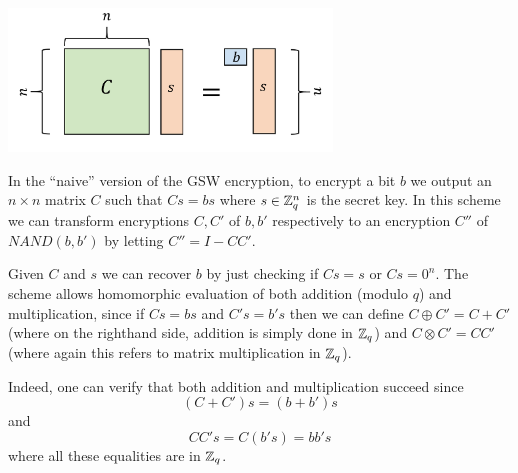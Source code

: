 
\begin{marginfigure}
\centering
\includegraphics[width=\linewidth, height=1.5in, keepaspectratio]{../figure/naivegsw.png}
\caption{In the ``naive'' version of the GSW encryption, to encrypt a
bit \(b\) we output an \(n\times n\) matrix \(C\) such that \(Cs=bs\)
where \(s \in {\mathbb{Z}}_q^n\) is the secret key. In this scheme we can
transform encryptions \(C,C'\) of \(b,b'\) respectively to an encryption
\(C''\) of \(\ensuremath{\mathit{NAND}}(b,b')\) by letting
\(C'' = I-CC'\).}
\label{naivegswfig}
\end{marginfigure}

Given \(C\) and \(s\) we can recover \(b\) by just checking if \(Cs=s\)
or \(Cs=0^n\). The scheme allows homomorphic evaluation of both addition
(modulo \(q\)) and multiplication, since if \(Cs = bs\) and \(C's=b's\)
then we can define \(C \oplus C' = C + C'\) (where on the righthand
side, addition is simply done in \({\mathbb{Z}}_q\)) and
\(C\otimes C' = \ensuremath{\mathit{CC}}'\) (where again this refers to
matrix multiplication in \({\mathbb{Z}}_q\)).

Indeed, one can verify that both addition and multiplication succeed
since
\begin{equation*}
(C+C')s = (b+b')s
\end{equation*}
and
\begin{equation*}
\ensuremath{\mathit{CC}}'s = C(b's) = bb's
\end{equation*}
where all these equalities are in \({\mathbb{Z}}_q\).

